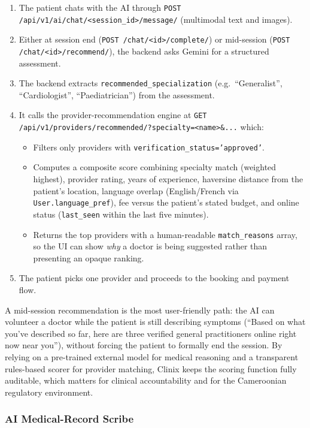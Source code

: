 \begin{enumerate}
  \item The patient chats with the AI through \texttt{POST /api/v1/ai/chat/<session\_id>/message/} (multimodal text and images).
  \item Either at session end (\texttt{POST /chat/<id>/complete/}) or mid-session (\texttt{POST /chat/<id>/recommend/}), the backend asks Gemini for a structured assessment.
  \item The backend extracts \texttt{recommended\_specialization} (e.g.\ ``Generalist'', ``Cardiologist'', ``Paediatrician'') from the assessment.
  \item It calls the provider-recommendation engine at \texttt{GET /api/v1/providers/recommended/?specialty=<name>\&...} which:
    \begin{itemize}
      \item Filters only providers with \texttt{verification\_status='approved'}.
      \item Computes a composite score combining specialty match (weighted highest), provider rating, years of experience, haversine distance from the patient's location, language overlap (English/French via \texttt{User.language\_pref}), fee versus the patient's stated budget, and online status (\texttt{last\_seen} within the last five minutes).
      \item Returns the top providers with a human-readable \texttt{match\_reasons} array, so the UI can show \emph{why} a doctor is being suggested rather than presenting an opaque ranking.
    \end{itemize}
  \item The patient picks one provider and proceeds to the booking and payment flow.
\end{enumerate}

A mid-session recommendation is the most user-friendly path: the AI can volunteer a doctor while the patient is still describing symptoms (``Based on what you've described so far, here are three verified general practitioners online right now near you''), without forcing the patient to formally end the session. By relying on a pre-trained external model for medical reasoning and a transparent rules-based scorer for provider matching, Clinix keeps the scoring function fully auditable, which matters for clinical accountability and for the Cameroonian regulatory environment.

\subsubsection*{AI Medical-Record Scribe}

